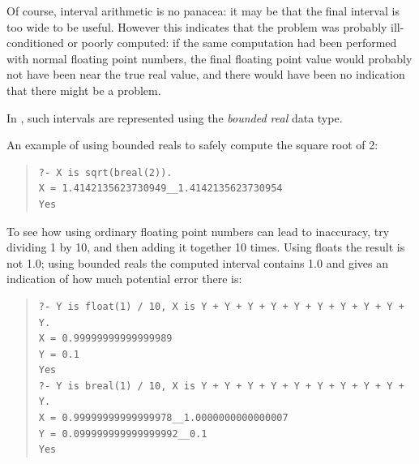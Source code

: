 Of course, interval arithmetic is no panacea: it may be that the final
interval is too wide to be useful.  However this indicates that the problem
was probably ill-conditioned or poorly computed: if the same computation had
been performed with normal floating point numbers, the final floating point
value would probably not have been near the true real value, and there would
have been no indication that there might be a problem.

In \eclipse{}, such intervals are represented using the \emph{bounded real}
data type.


An example of using bounded reals to safely compute the square root of 2:

\begin{quote}\begin{verbatim}
?- X is sqrt(breal(2)).
X = 1.4142135623730949__1.4142135623730954
Yes
\end{verbatim}\end{quote}

To see how using ordinary floating point numbers can lead to inaccuracy, try
dividing 1 by 10, and then adding it together 10 times.  Using floats the
result is not 1.0; using bounded reals the computed interval contains 1.0
and gives an indication of how much potential error there is:

\begin{quote}\begin{verbatim}
?- Y is float(1) / 10, X is Y + Y + Y + Y + Y + Y + Y + Y + Y + Y.
X = 0.99999999999999989
Y = 0.1
Yes
?- Y is breal(1) / 10, X is Y + Y + Y + Y + Y + Y + Y + Y + Y + Y.
X = 0.99999999999999978__1.0000000000000007
Y = 0.099999999999999992__0.1
Yes
\end{verbatim}\end{quote}


